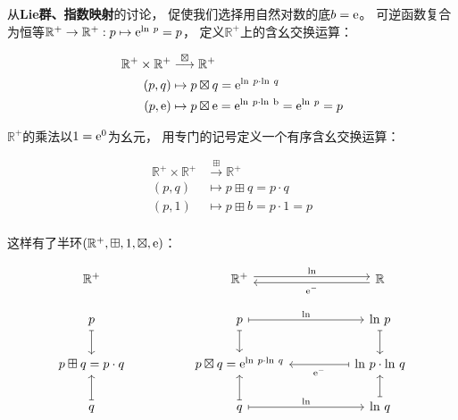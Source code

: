 ﻿\documentclass[10pt,a4paper]{article}
\numberwithin{equation}{section}
\newcommand{\sqplus}{\mathbin{\boxplus}}
\newcommand{\sqtimes}{\mathbin{\boxtimes}}
\begin{document}
从\textbf{Lie群、指数映射}的讨论，
促使我们选择用自然对数的底$b = \text e$。
可逆函数复合为恒等$\mathbb R^+ \to \mathbb R^+: p \mapsto \text e^{\text{ln} \ p} = p$，
定义$\mathbb R^+$上的含幺交换运算：

$$
\begin{aligned}
\mathbb R^+ \times \mathbb R^+ &\stackrel{\sqtimes}{\longrightarrow} \mathbb R^+ \\    
(p,q) &\mapsto p \sqtimes q = \text e^{\text{ln} \ p \cdot \text{ln} \ q} \\
(p,\text e) &\mapsto p \sqtimes \text e = \text e^{\text{ln} \ p \cdot \text{ln} \ \text b} = \text e^{\text{ln} \ p} = p \\
\end{aligned}
$$

$\mathbb R^+$的乘法以$1 = \text e^0$为幺元，
用专门的记号定义一个有序含幺交换运算：

$$
\begin{aligned}
\mathbb R^+ \times \mathbb R^+ &\stackrel{\sqplus}{\longrightarrow} \mathbb R^+ \\    
(p,q) &\mapsto p \sqplus q = p \cdot q \\
(p,1) &\mapsto p \sqplus b = p \cdot 1 = p \\
\end{aligned}
$$

这样有了半环$(\mathbb R^+,\sqplus,1,\sqtimes,\text e)$：

$$
\begin{tikzcd}
\mathbb R^+             &  & \mathbb R^+ \arrow[rr, "\text{ln}", shift left]               &  & \mathbb R \arrow[ll, "\text e^-", shift left]                          \\
p \arrow[d, maps to]    &  & p \arrow[rr, "\text{ln}", maps to] \arrow[d, maps to]         &  & \text{ln} \ p \arrow[d, maps to]                                       \\
p \sqplus q = p \cdot q &  & p \sqtimes q =\text e^{\text{ln} \ p \cdot \text{ln} \ q} &  & \text{ln} \ p \cdot \text{ln} \ q \arrow[ll, "\text e^-", maps to] \\
q \arrow[u, maps to]    &  & q \arrow[rr, "\text{ln}", maps to] \arrow[u, maps to]         &  & \text{ln} \ q \arrow[u, maps to]                                      
\end{tikzcd}
$$
\end{document}
